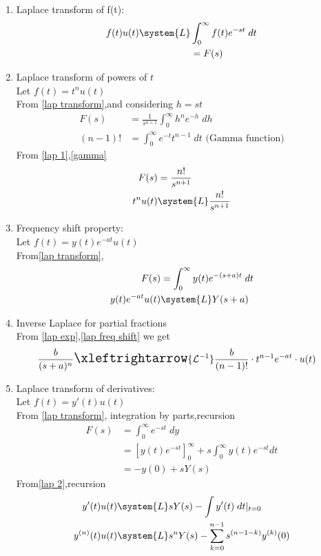 \begin{enumerate}[label=\thechapter.\arabic*,ref=\thechapter.\theenumi]
\item Laplace transform of f(t):
\begin{align}
        f(t)u(t)\system{L}&\int_{0}^{\infty}f(t)e^{-st}\; dt\\
        &=F(s)\label{lap transform}
\end{align}
\item Laplace transform of powers of $t$\\
        Let $f(t)=t^nu(t)$\\
From \eqref{lap transform},and considering $h=st$
\begin{align}
        F(s)&=\frac{1}{s^{n+1}}\int_{0}^{\infty}h^ne^{-h}\;dh\label{lap 1}\\
        (n-1)!&=\int_0^\infty e^{-t}t^{n-1}\;dt\text{ (Gamma function)}\label{gamma}
\end{align}
From \eqref{lap 1},\eqref{gamma}
\begin{align}
        F(s)&=\frac{n!}{s^{n+1}}\\
         t^nu(t)&\system{L}\frac{n!}{s^{n+1}}\label{lap exp}
\end{align}
\item Frequency shift property:\\
        Let $f(t)=y(t)e^{-at}u(t)$\\
From\eqref{lap transform},
\begin{align}
        F(s)&=\int_0^{\infty}y(t)e^{-(s+a)t}\;dt\\
         y(t)e^{-at}u(t)&\system{L}Y(s+a)\label{lap freq shift}
\end{align}
\item Inverse Laplace for partial fractions\\
From \eqref{lap exp},\eqref{lap freq shift} we get
\begin{align}
    &\frac{b}{(s+a)^n}\Large\xleftrightarrow{\mathcal{L}^{-1}}\frac{b}{(n-1)!}\cdot t^{n-1} e^{-at}\cdot u(t)\label{inv lap (partial fractions)}
\end{align}
\item Laplace transform of derivatives:\\
        Let $f(t)=y'(t)u(t)$\\
From \eqref{lap transform}, integration by parts,recursion
\begin{align}
        F(s)&=\int_{0}^\infty e^{-st}\; dy\\
        &=[y(t)e^{-st}]_0^\infty+s\int_0^\infty y(t)e^{-st}dt\\
        &=-y(0)+sY(s)\label{lap 2}
\end{align}
From\eqref{lap 2},recursion
\begin{align}
        y'(t)u(t)&\system{L}sY(s)-\int y'(t)\;dt\vert_{t=0}\\
        y^{(n)}(t)u(t)&\system{L}s^nY(s)-\sum\limits_{k=0}^{n-1}s^{(n-1-k)}y^{(k)}(0)\label{lap (derivatives)}
\end{align}
\end{enumerate}
